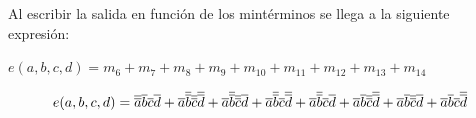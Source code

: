Al escribir la salida en función de los mintérminos se llega a la siguiente expresión:\\
\centerline{$e(a,b,c,d)=m_{6}+m_{7}+m_{8}+m_{9}+m_{10}+m_{11}+m_{12}+m_{13}+m_{14}$}
\begin{equation}
	\centerline{$e(a,b,c,d)=\overline{\overline{a}}\overline{b}\overline{c}\overline{d}+\overline{a}\overline{\overline{b}}\overline{\overline{c}}\overline{\overline{d}}+\overline{a}\overline{\overline{b}}\overline{\overline{c}}\overline{d}+\overline{a}\overline{\overline{b}}\overline{c}\overline{\overline{d}}+\overline{a}\overline{\overline{b}}\overline{c}\overline{d}+\overline{a}\overline{b}\overline{\overline{c}}\overline{\overline{d}}+\overline{a}\overline{b}\overline{\overline{c}}\overline{d}+\overline{a}\overline{b}\overline{c}\overline{\overline{d}}$}
\end{equation}


